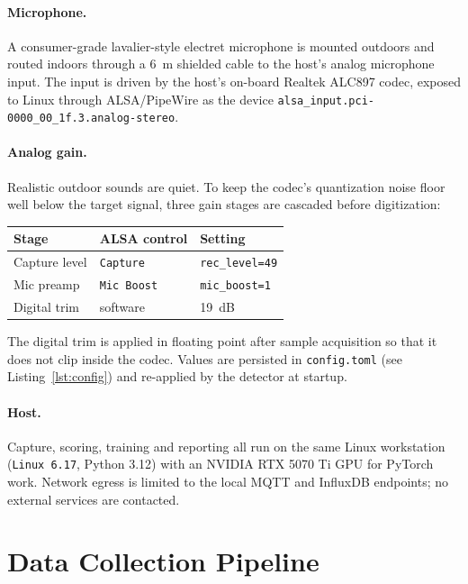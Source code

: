 \documentclass[10pt,twocolumn]{article}
\begin{document}
\paragraph{Microphone.} A consumer-grade lavalier-style electret
microphone is mounted outdoors and routed indoors through a
\SI{6}{m} shielded cable to the host's analog microphone input. The
input is driven by the host's on-board Realtek ALC897 codec, exposed to
Linux through ALSA/PipeWire as the device
\texttt{alsa\_input.pci-0000\_00\_1f.3.analog-stereo}.

\paragraph{Analog gain.} Realistic outdoor sounds are quiet. To keep
the codec's quantization noise floor well below the target signal, three
gain stages are cascaded before digitization:

\begin{center}
\small
\begin{tabular}{lll}
\toprule
Stage & ALSA control & Setting \\
\midrule
Capture level & \texttt{Capture} & \texttt{rec\_level=49} \\
Mic preamp    & \texttt{Mic Boost} & \texttt{mic\_boost=1} \\
Digital trim  & software          & \SI{+19}{dB} \\
\bottomrule
\end{tabular}
\end{center}

The digital trim is applied in floating point after sample acquisition
so that it does not clip inside the codec. Values are persisted in
\texttt{config.toml} (see Listing~\ref{lst:config}) and re-applied by
the detector at startup.

\paragraph{Host.} Capture, scoring, training and reporting all run on
the same Linux workstation (\texttt{Linux 6.17}, Python 3.12) with an
NVIDIA RTX 5070 Ti GPU for PyTorch work. Network egress is limited to
the local MQTT and InfluxDB endpoints; no external services are
contacted.

\section{Data Collection Pipeline}
\end{document}
